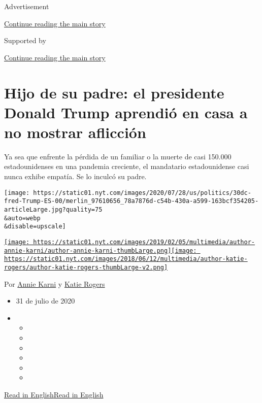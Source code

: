 Advertisement

\protect\hyperlink{after-top}{Continue reading the main story}

Supported by

\protect\hyperlink{after-sponsor}{Continue reading the main story}

\hypertarget{hijo-de-su-padre-el-presidente-donald-trump-aprendiuxf3-en-casa-a-no-mostrar-aflicciuxf3n}{%
\section{Hijo de su padre: el presidente Donald Trump aprendió en casa a
no mostrar
aflicción}\label{hijo-de-su-padre-el-presidente-donald-trump-aprendiuxf3-en-casa-a-no-mostrar-aflicciuxf3n}}

Ya sea que enfrente la pérdida de un familiar o la muerte de casi
150.000 estadounidenses en una pandemia creciente, el mandatario
estadounidense casi nunca exhibe empatía. Se lo inculcó su padre.

\texttt{[image: https://static01.nyt.com/images/2020/07/28/us/politics/30dc-fred-Trump-ES-00/merlin\_97610656\_78a7876d-c54b-430a-a599-163bcf354205-articleLarge.jpg?quality=75\\\&auto=webp\\\&disable=upscale]}

\href{https://www.nytimes.com/by/annie-karni}{\texttt{[image: https://static01.nyt.com/images/2019/02/05/multimedia/author-annie-karni/author-annie-karni-thumbLarge.png]}}\href{https://www.nytimes.com/by/katie-rogers}{\texttt{[image: https://static01.nyt.com/images/2018/06/12/multimedia/author-katie-rogers/author-katie-rogers-thumbLarge-v2.png]}}

Por \href{https://www.nytimes.com/by/annie-karni}{Annie Karni} y
\href{https://www.nytimes.com/by/katie-rogers}{Katie Rogers}

\begin{itemize}
\item
  31 de julio de 2020
\item
  \begin{itemize}
  \item
  \item
  \item
  \item
  \item
  \item
  \end{itemize}
\end{itemize}

\href{https://www.nytimes.com/2020/07/28/us/politics/donald-fred-trump.html}{Read
in
English}\href{https://www.nytimes.com/2020/07/28/us/politics/donald-fred-trump.html}{Read
in English}

